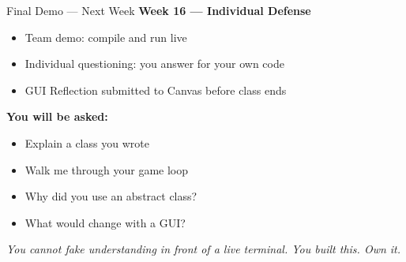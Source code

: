 \documentclass{beamer}
\begin{document}
\begin{frame}{Final Demo --- Next Week}
\textbf{Week 16 --- Individual Defense}
\vspace{0.3cm}
\begin{itemize}
  \item Team demo: compile and run live
  \item Individual questioning: you answer for your own code
  \item GUI Reflection submitted to Canvas before class ends
\end{itemize}
\vspace{0.3cm}
\textbf{You will be asked:}
\begin{itemize}
  \item Explain a class you wrote
  \item Walk me through your game loop
  \item Why did you use an abstract class?
  \item What would change with a GUI?
\end{itemize}
\vspace{0.3cm}
\textit{You cannot fake understanding in front of a live terminal. You built this. Own it.}
\end{frame}
\end{document}
